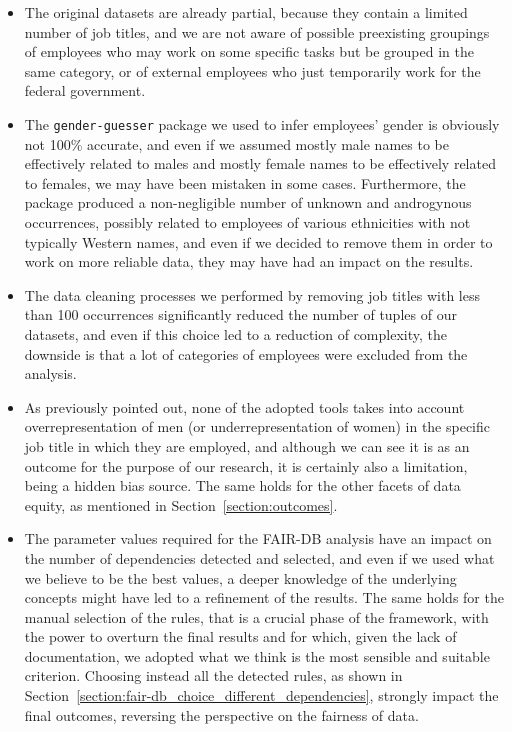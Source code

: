 \begin{itemize}
\item The original datasets are already partial, because they contain a limited number of job titles, and we are not aware of possible preexisting groupings of employees who may work on some specific tasks but be grouped in the same category, or of external employees who just temporarily work for the federal government.
\item The \texttt{gender-guesser} package we used to infer employees' gender is obviously not 100\% accurate, and even if we assumed mostly male names to be effectively related to males and mostly female names to be effectively related to females, we may have been mistaken in some cases. Furthermore, the package produced a non-negligible number of unknown and androgynous occurrences, possibly related to employees of various ethnicities with not typically Western names, and even if we decided to remove them in order to work on more reliable data, they may have had an impact on the results.
\item The data cleaning processes we performed by removing job titles with less than 100 occurrences significantly reduced the number of tuples of our datasets, and even if this choice led to a reduction of complexity, the downside is that a lot of categories of employees were excluded from the analysis.
\item As previously pointed out, none of the adopted tools takes into account overrepresentation of men (or underrepresentation of women) in the specific job title in which they are employed, and although we can see it is as an outcome for the purpose of our research, it is certainly also a limitation, being a hidden bias source. The same holds for the other facets of data equity, as mentioned in Section~\ref{section:outcomes}.
\item The parameter values required for the FAIR-DB analysis have an impact on the number of dependencies detected and selected, and even if we used what we believe to be the best values, a deeper knowledge of the underlying concepts might have led to a refinement of the results. The same holds for the manual selection of the rules, that is a crucial phase of the framework, with the power to overturn the final results and for which, given the lack of documentation, we adopted what we think is the most sensible and suitable criterion. Choosing instead all the detected rules, as shown in Section~\ref{section:fair-db_choice_different_dependencies}, strongly impact the final outcomes, reversing the perspective on the fairness of data.

\end{itemize}
